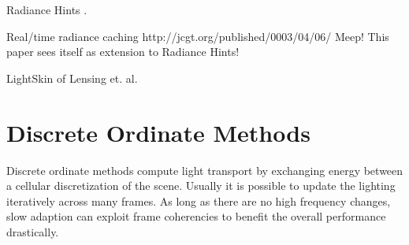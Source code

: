 \documentclass[thesis.tex]{subfiles}
\begin{document}
Radiance Hints \cite{bib:radiancehints}.

Real/time radiance caching http://jcgt.org/published/0003/04/06/ \cite{bib:radiancecachechromaticcompression}
Meep! This paper sees itself as extension to Radiance Hints!

LightSkin \cite{bib:LightskinPaper} of Lensing et. al.


\section{Discrete Ordinate Methods}
Discrete ordinate methods compute light transport by exchanging energy between a cellular discretization of the scene.
Usually it is possible to update the lighting iteratively across many frames.
As long as there are no high frequency changes, slow adaption can exploit frame coherencies to benefit the overall performance drastically.
\end{document}
